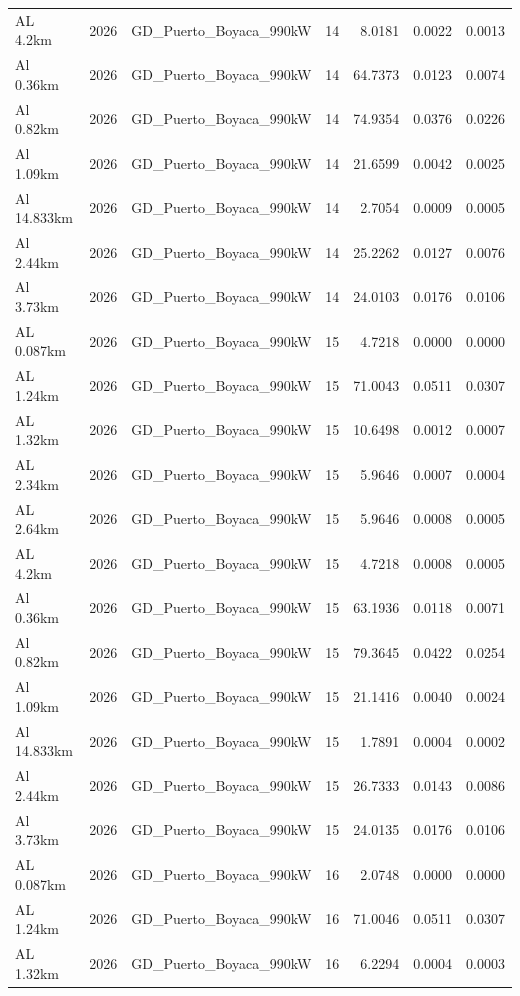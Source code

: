 \documentclass[11pt,a4paper]{article}
\begin{document}
\begin{longtable}{llllrrr}
AL 4.2km & 2026 & GD\_Puerto\_Boyaca\_990kW & 14 & 8.0181 & 0.0022 & 0.0013 \\
Al 0.36km & 2026 & GD\_Puerto\_Boyaca\_990kW & 14 & 64.7373 & 0.0123 & 0.0074 \\
Al 0.82km & 2026 & GD\_Puerto\_Boyaca\_990kW & 14 & 74.9354 & 0.0376 & 0.0226 \\
Al 1.09km & 2026 & GD\_Puerto\_Boyaca\_990kW & 14 & 21.6599 & 0.0042 & 0.0025 \\
Al 14.833km & 2026 & GD\_Puerto\_Boyaca\_990kW & 14 & 2.7054 & 0.0009 & 0.0005 \\
Al 2.44km & 2026 & GD\_Puerto\_Boyaca\_990kW & 14 & 25.2262 & 0.0127 & 0.0076 \\
Al 3.73km & 2026 & GD\_Puerto\_Boyaca\_990kW & 14 & 24.0103 & 0.0176 & 0.0106 \\
AL 0.087km & 2026 & GD\_Puerto\_Boyaca\_990kW & 15 & 4.7218 & 0.0000 & 0.0000 \\
AL 1.24km & 2026 & GD\_Puerto\_Boyaca\_990kW & 15 & 71.0043 & 0.0511 & 0.0307 \\
AL 1.32km & 2026 & GD\_Puerto\_Boyaca\_990kW & 15 & 10.6498 & 0.0012 & 0.0007 \\
AL 2.34km & 2026 & GD\_Puerto\_Boyaca\_990kW & 15 & 5.9646 & 0.0007 & 0.0004 \\
AL 2.64km & 2026 & GD\_Puerto\_Boyaca\_990kW & 15 & 5.9646 & 0.0008 & 0.0005 \\
AL 4.2km & 2026 & GD\_Puerto\_Boyaca\_990kW & 15 & 4.7218 & 0.0008 & 0.0005 \\
Al 0.36km & 2026 & GD\_Puerto\_Boyaca\_990kW & 15 & 63.1936 & 0.0118 & 0.0071 \\
Al 0.82km & 2026 & GD\_Puerto\_Boyaca\_990kW & 15 & 79.3645 & 0.0422 & 0.0254 \\
Al 1.09km & 2026 & GD\_Puerto\_Boyaca\_990kW & 15 & 21.1416 & 0.0040 & 0.0024 \\
Al 14.833km & 2026 & GD\_Puerto\_Boyaca\_990kW & 15 & 1.7891 & 0.0004 & 0.0002 \\
Al 2.44km & 2026 & GD\_Puerto\_Boyaca\_990kW & 15 & 26.7333 & 0.0143 & 0.0086 \\
Al 3.73km & 2026 & GD\_Puerto\_Boyaca\_990kW & 15 & 24.0135 & 0.0176 & 0.0106 \\
AL 0.087km & 2026 & GD\_Puerto\_Boyaca\_990kW & 16 & 2.0748 & 0.0000 & 0.0000 \\
AL 1.24km & 2026 & GD\_Puerto\_Boyaca\_990kW & 16 & 71.0046 & 0.0511 & 0.0307 \\
AL 1.32km & 2026 & GD\_Puerto\_Boyaca\_990kW & 16 & 6.2294 & 0.0004 & 0.0003 \\

\end{longtable}
\end{document}
